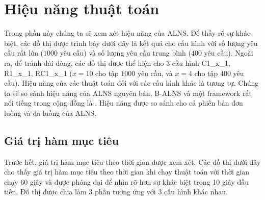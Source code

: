 \section{Hiệu năng thuật toán}
Trong phần này chúng ta sẽ xem xét hiệu năng của ALNS. Để thấy rõ sự khác biệt, các đồ thị được trình bày dưới đây là kết quả cho cấu hình với số lượng yêu cầu rất lớn ($1000$ yêu cầu) và số lượng yêu cầu trung bình ($400$ yêu cầu). Ngoài ra, để tránh dài dòng, các đồ thị được thể hiện cho 3 cầu hình C1\_x\_1, R1\_x\_1, RC1\_x\_1 ($x = 10$ cho tập $1000$ yêu cầu, và $x=4$ cho tập $400$ yêu cầu). Hiệu năng của các thuật toán đối với các cấu hình khác là tương tự. Chúng ta sẽ so sánh hiệu năng của ALNS nguyên bản, B-ALNS và một framework rất nổi tiếng trong cộng đồng là . Hiệu năng được so sánh cho cả phiên bản đơn luồng và đa luồng của ALNS.

\subsection{Giá trị hàm mục tiêu}

Trước hết, giá trị hàm mục tiêu theo thời gian được xem xét. Các đồ thị dưới đây cho thấy giá trị hàm mục tiêu theo thời gian khi chạy thuật toán với thời gian chạy 60 giây và được phóng đại để nhìn rõ hơn sự khác biệt trong 10 giây đầu tiên. Đồ thị được chia làm 3 phần tương ứng với 3 cấu hình khác nhau.

